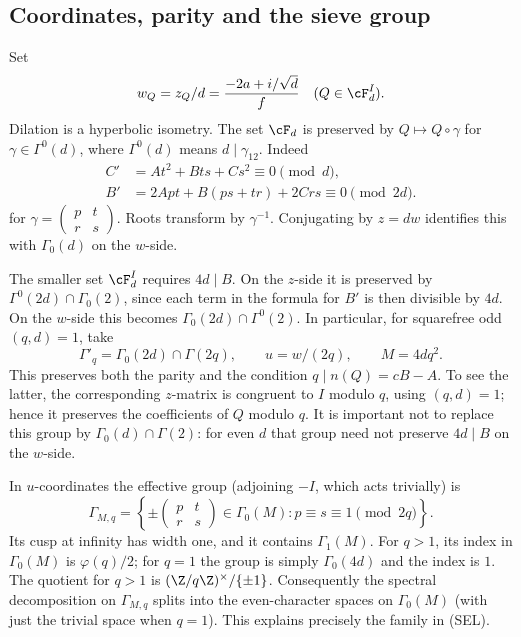 \subsection{Coordinates, parity and the sieve group}
Set
\begin{equation}\label{A:eq:wcoord}
 w_Q=z_Q/d=\frac{-2a+i/\sqrt d}{f}\quad(Q\in\cF_d^I).
\end{equation}
Dilation is a hyperbolic isometry. The set $\cF_d$ is preserved by
$Q\mapsto Q\circ\gamma$ for $\gamma\in\Gamma^0(d)$, where
$\Gamma^0(d)$ means $d\mid\gamma_{12}$. Indeed
\begin{align*}
 C'&=At^2+Bts+Cs^2\equiv0\pmod d,\\
 B'&=2Apt+B(ps+tr)+2Crs\equiv0\pmod{2d}.
\end{align*}
for $\gamma=\left(\begin{smallmatrix}p&t\\r&s\end{smallmatrix}\right)$.
Roots transform by $\gamma^{-1}$. Conjugating by $z=dw$ identifies this
with $\Gamma_0(d)$ on the $w$-side.

The smaller set $\cF_d^I$ requires $4d\mid B$. On the $z$-side it is
preserved by $\Gamma^0(2d)\cap\Gamma_0(2)$, since each term in the
formula for $B'$ is then divisible by $4d$. On the $w$-side this becomes
$\Gamma_0(2d)\cap\Gamma^0(2)$.
In particular, for squarefree odd $(q,d)=1$, take
\begin{equation}\label{A:eq:sievegroup}
 \Gamma'_q=\Gamma_0(2d)\cap\Gamma(2q),\qquad u=w/(2q),\qquad M=4dq^2.
\end{equation}
This preserves both the parity and the condition
$q\mid n(Q)=cB-A$. To see the latter, the corresponding $z$-matrix is
congruent to $I$ modulo $q$, using $(q,d)=1$; hence it preserves the
coefficients of $Q$ modulo $q$. It is important not to replace this group
by $\Gamma_0(d)\cap\Gamma(2)$: for even $d$ that group need not preserve
$4d\mid B$ on the $w$-side.

In $u$-coordinates the effective group (adjoining $-I$, which acts trivially)
is
\[
 \Gamma_{M,q}=
 \left\{\pm\begin{pmatrix}p&t\\r&s\end{pmatrix}\in\Gamma_0(M):
                                     p\equiv s\equiv1\pmod{2q}\right\}.
\]
Its cusp at infinity has width one, and it contains $\Gamma_1(M)$.
For $q>1$, its index in $\Gamma_0(M)$ is $\varphi(q)/2$; for $q=1$
the group is simply $\Gamma_0(4d)$ and the index is $1$.
The quotient for $q>1$ is $(\Z/q\Z)^\times/\{\pm1\}$.
Consequently the spectral decomposition on $\Gamma_{M,q}$ splits into
the even-character spaces on $\Gamma_0(M)$ (with just the trivial space
when $q=1$). This explains precisely the family in (SEL).

